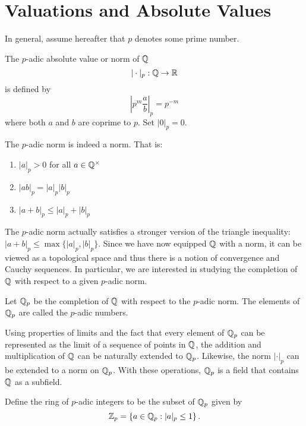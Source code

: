 \section{Valuations and Absolute Values}

In general, assume hereafter that $p$ denotes some prime number.

\begin{definition}
    The $p$-adic absolute value or norm of $\mathbb{Q}$
        \[|\cdot |_p: \mathbb{Q} \to \mathbb{R}\]
    is defined by
        \[\left| p^m \frac{a}{b}\right|_{p} = p^{-m}\]
    where both $a$ and $b$ are coprime to $p$. Set $|0|_p = 0$.
\end{definition}

\begin{proposition}
    The $p$-adic norm is indeed a norm. That is:

    \begin{enumerate}
        \item $|a|_p > 0$ for all $a \in \mathbb{Q}^\times$
        \item $|ab|_p = |a|_p|b|_p$
        \item $|a + b|_p \leq |a|_p + |b|_p$
    \end{enumerate}
\end{proposition}

The $p$-adic norm actually satisfies a stronger version of the triangle inequality:
$|a + b|_p \leq \max\{ |a|_p ,|b|_p\}$. Since we have now equipped $\mathbb{Q}$ with a norm, it can be viewed as a topological space and thus there is a notion of convergence and Cauchy sequences. In particular, we are interested in studying the completion of $\mathbb{Q}$ with respect to a given $p$-adic norm.

\begin{definition}
    Let $\mathbb{Q}_p$ be the completion of $\mathbb{Q}$ with respect to the $p$-adic norm. The elements of $\mathbb{Q}_p$ are called the $p$-adic numbers.
\end{definition}

Using properties of limits and the fact that every element of $\mathbb{Q}_p$ can be represented as the limit of a sequence of points in $\mathbb{Q}$, the addition and multiplication of $\mathbb{Q}$ can be naturally extended to $\mathbb{Q}_p$. Likewise, the norm $|\cdot|_p$ can be extended to a norm on $\mathbb{Q}_p$. With these operations, $\mathbb{Q}_p$ is a field that contains $\mathbb{Q}$ as a subfield.

\begin{definition}
    Define the ring of $p$-adic integers to be the subset of $\mathbb{Q}_p$ given by
        \[\mathbb{Z}_p = \left\{a \in \mathbb{Q}_p: |a|_p \leq 1\right\}.\]
\end{definition}

